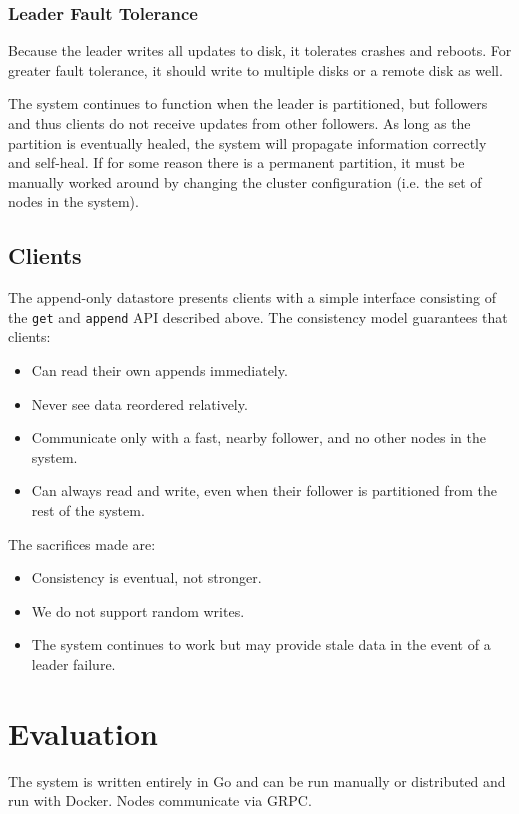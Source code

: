 \documentclass[11pt,english,twocolumn]{article}
\begin{document}
\subsubsection{Leader Fault Tolerance}
Because the leader writes all updates to disk, it tolerates crashes and reboots.
For greater fault tolerance, it should write to multiple disks or a remote disk
as well.

The system continues to function when the leader is partitioned, but followers
and thus clients do not receive updates from other followers. As long as the
partition is eventually healed, the system will propagate information correctly
and self-heal. If for some reason there is a permanent partition, it must be
manually worked around by changing the cluster configuration (i.e. the set of
nodes in the system).

\subsection{Clients}
The append-only datastore presents clients with a simple interface consisting of
the \texttt{get} and \texttt{append} API described above. The consistency model
guarantees that clients:

\begin{itemize}
	\item Can read their own appends immediately.
	\item Never see data reordered relatively.
	\item Communicate only with a fast, nearby follower, and no other nodes
		in the system.
	\item Can always read and write, even when their follower is partitioned
		from the rest of the system.
\end{itemize}

The sacrifices made are:

\begin{itemize}
	\item Consistency is eventual, not stronger.
	\item We do not support random writes.
	\item The system continues to work but may provide stale data in the
		event of a leader failure.
\end{itemize}

\section{Evaluation}
The system is written entirely in Go and can be run manually or distributed and
run with Docker. Nodes communicate via GRPC.
\end{document}

